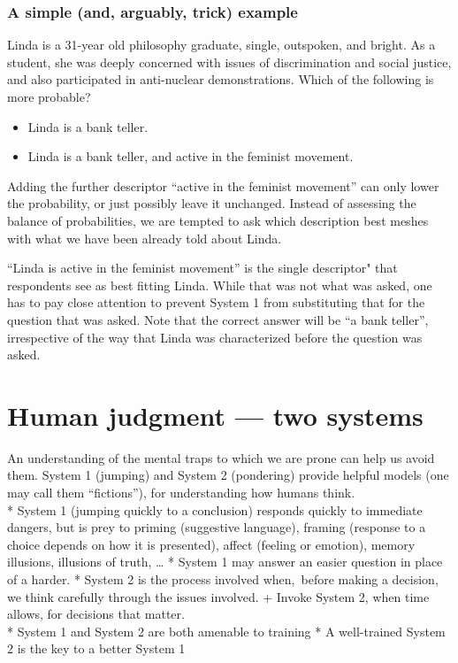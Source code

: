 \documentclass[
  10pt,
  b5paper]{book}
\providecommand{\tightlist}{%
  \setlength{\itemsep}{0pt}\setlength{\parskip}{0pt}}
\begin{document}
\hypertarget{a-simple-and-arguably-trick-example}{%
\subsection*{A simple (and, arguably, trick) example}\label{a-simple-and-arguably-trick-example}}

Linda is a 31-year old philosophy graduate, single,
outspoken, and bright. As a student, she was deeply
concerned with issues of discrimination and social
justice, and also participated in anti-nuclear
demonstrations. Which of the following is more probable?

\begin{itemize}
\tightlist
\item
  Linda is a bank teller.
\item
  Linda is a bank teller, and active in the feminist
  movement.
\end{itemize}

Adding the further descriptor ``active in the feminist
movement'' can only lower the probability, or just possibly
leave it unchanged. Instead of assessing the balance of
probabilities, we are tempted to ask which description best
meshes with what we have been already told about Linda.

``Linda is active in the feminist movement'' is the single
descriptor" that respondents see as best fitting Linda.
While that was not what was asked, one has to pay close
attention to prevent System 1 from substituting that for
the question that was asked. Note that the correct
answer will be ``a bank teller'', irrespective of the way
that Linda was characterized before the question was asked.

\hypertarget{human-judgment-two-systems}{%
\chapter{Human judgment --- two systems}\label{human-judgment-two-systems}}

An understanding of the mental traps to which we are prone
can help us avoid them.
System 1 (jumping) and System 2 (pondering) provide helpful
models (one may call them ``fictions''), for understanding how
humans think.\\
* System 1 (jumping quickly to a conclusion) responds quickly to
immediate dangers, but is prey to
priming (suggestive language), framing (response to a choice
depends on how it is presented), affect (feeling or emotion),
memory illusions, illusions of truth, \ldots{}
* System 1 may answer an easier question in place of a harder.
* System 2 is the process involved when,~before making a decision,
we think carefully through the issues involved.
+ Invoke System 2, when time allows, for decisions that matter.\\
* System 1 and System 2 are both amenable to training
* A well-trained System 2 is the key to a better System 1
\end{document}
